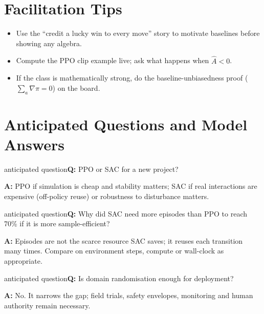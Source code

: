 \documentclass[11pt]{article}
\begin{document}
\section{Facilitation Tips}\begin{itemize}\item Use the ``credit a lucky win to every move'' story to motivate baselines before showing any algebra.\item Compute the PPO clip example live; ask what happens when $\hat A<0$.\item If the class is mathematically strong, do the baseline-unbiasedness proof ($\sum_a\nabla\pi=0$) on the board.\end{itemize}

\section{Anticipated Questions and Model Answers}

\begin{question}{anticipated question}\textbf{Q:} PPO or SAC for a new project?\par\smallskip\textbf{A:} PPO if simulation is cheap and stability matters; SAC if real interactions are expensive (off-policy reuse) or robustness to disturbance matters.\end{question}

\begin{question}{anticipated question}\textbf{Q:} Why did SAC need more episodes than PPO to reach 70\% if it is more sample-efficient?\par\smallskip\textbf{A:} Episodes are not the scarce resource SAC saves; it reuses each transition many times. Compare on environment steps, compute or wall-clock as appropriate.\end{question}

\begin{question}{anticipated question}\textbf{Q:} Is domain randomisation enough for deployment?\par\smallskip\textbf{A:} No. It narrows the gap; field trials, safety envelopes, monitoring and human authority remain necessary.\end{question}
\end{document}
